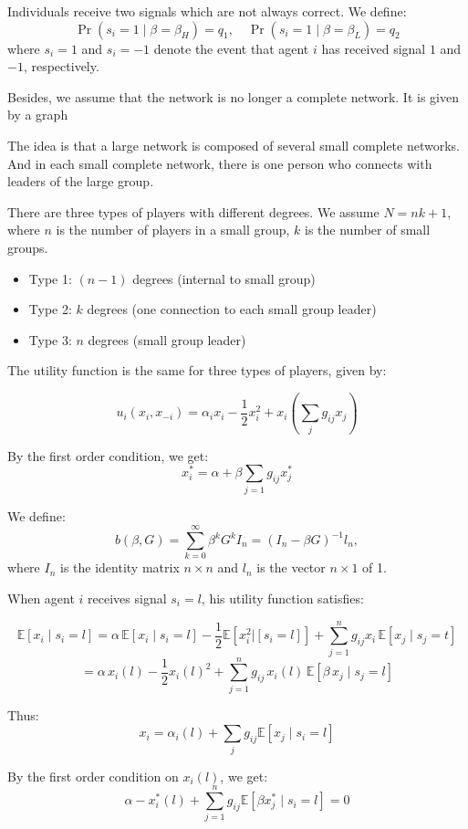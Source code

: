 \documentclass[12pt]{article}
\begin{document}
Individuals receive two signals which are not always correct.  
We define:
\[
\Pr(s_i = 1 \mid \beta = \beta_H) = q_1, \quad \Pr(s_i = 1 \mid \beta = \beta_L) = q_2
\]
where $s_i = 1$ and $s_i = -1$ denote the event that agent $i$ has received signal $1$ and $-1$, respectively.

Besides, we assume that the network is no longer a complete network.  
It is given by a graph


The idea is that a large network is composed of several small complete networks.  
And in each small complete network, there is one person who connects with leaders of the large group.

There are three types of players with different degrees.  
We assume $N = nk + 1$, where $n$ is the number of players in a small group, $k$ is the number of small groups.

\begin{itemize}
    \item Type 1: $(n-1)$ degrees (internal to small group)
    \item Type 2: $k$ degrees (one connection to each small group leader)
    \item Type 3: $n$ degrees (small group leader)
\end{itemize}

The utility function is the same for three types of players, given by:

\[
u_i(x_i, x_{-i}) = \alpha_i x_i - \frac{1}{2}x_i^2 + x_i\left( \sum_j g_{ij} x_j \right)
\]

By the first order condition, we get:
\[
x_i^* = \alpha + \beta \sum_{j = 1} g_{ij} x_j^*
\]

We define:
\[
b(\beta, G) = \sum_{k=0}^{\infty} \beta^k G^k I_n = (I_n - \beta G)^{-1} l_n,
\]
where \( I_n \) is the identity matrix \( n \times n \) and \( l_n \) is the vector \( n \times 1 \) of 1.

When agent $i$ receives signal $s_i = l$, his utility function satisfies:


\[
\mathbb{E}[x_i \mid s_i = l] = \alpha \, \mathbb{E}[x_i \mid s_i = l]
-\frac{1}{2}\mathbb{E}[x_i^2|[s_i=l]]+ \sum_{j = 1}^n g_{ij} x_i\, \mathbb{E}[x_j \mid s_j = t]
\]
\[
= \alpha \, x_i(l) - \frac{1}{2} x_i(l)^2 + \sum_{j=1}^{n} g_{ij} \, x_i(l) \, \mathbb{E}\left[ \beta \, x_j \mid s_j = l \right]
\]


Thus:
\[
x_i = \alpha_i(l) + \sum_j g_{ij} \mathbb{E}[x_j \mid s_i = l]
\]

By the first order condition on $x_i(l)$, we get:
\[
\alpha -x_i^*(l) +\sum_{j=1}^{n} g_{ij} \mathbb{E}[\beta x_j^* \mid s_i = l]=0
\]
\end{document}
